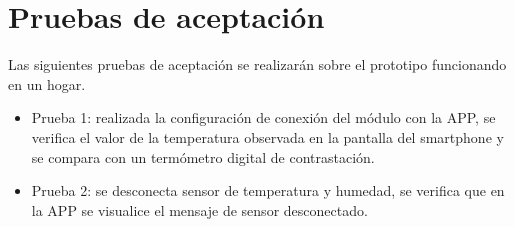 \documentclass[11pt]{article}
\begin{document}
\section{Pruebas de aceptación}
Las siguientes pruebas de aceptación se realizarán sobre el prototipo funcionando en un hogar.
\begin{itemize}
\item Prueba 1: realizada la configuración de conexión del módulo con la APP, se verifica el valor de la temperatura observada en la pantalla del smartphone y se compara con un termómetro digital de contrastación.
\item Prueba 2: se desconecta sensor de temperatura y humedad, se verifica que en la APP se visualice el mensaje de sensor desconectado.
\end{itemize}
\end{document}
